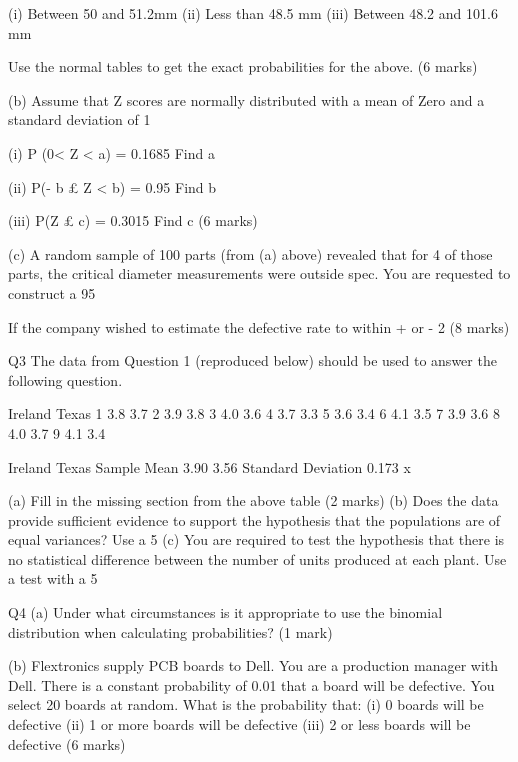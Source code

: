 (i)	 Between 50 and 51.2mm
(ii)	 Less than 48.5 mm
(iii)	 Between 48.2 and 101.6 mm

Use the normal tables to get the exact probabilities for the above.
										(6 marks)



(b)	Assume that Z scores are normally distributed with a mean of Zero and a
 	standard deviation of 1
 
(i) 	P (0< Z < a)  =  0.1685 			 Find   a 

(ii)            P(- b £ Z < b) =  0.95		            	 Find   b

     	(iii)             P(Z £ c)  =       0.3015 			 Find   c
										(6 marks)
									
						

(c)	A random sample of 100 parts (from (a) above) revealed that for 4 of those parts, the critical diameter measurements were outside spec.  You are requested to construct a 95%

If the company wished to estimate the defective rate to within + or - 2%
										(8 marks)


 

Q3
The data from Question 1 (reproduced below) should be used to answer the following question.

	Ireland	Texas
1	3.8	3.7
2	3.9	3.8
3	4.0	3.6
4	3.7	3.3
5	3.6	3.4
6	4.1	3.5
7	3.9	3.6
8	4.0	3.7
9	4.1	3.4



	Ireland	Texas
Sample Mean	3.90	3.56
Standard Deviation	0.173	x
	
(a)	Fill in the missing section from the above table			(2 marks)
(b)	Does the data provide sufficient evidence to support the hypothesis that the populations are of equal variances?  Use a 5%
(c)	You are required to test the hypothesis that there is no statistical difference between the number of units produced at each plant.  Use a test with a 5%



Q4 
(a)	Under what circumstances is it appropriate to use the binomial distribution when calculating probabilities?					(1 mark)

(b) 	Flextronics supply PCB boards to Dell.  You are a production manager with Dell.  There is a constant probability of 0.01 that a board will be defective.  You select 20 boards at random.  What is the probability that:
(i)	0 boards will be defective
(ii)	1 or more boards will be defective
(iii)	2 or less boards will be defective			
(6 marks)

